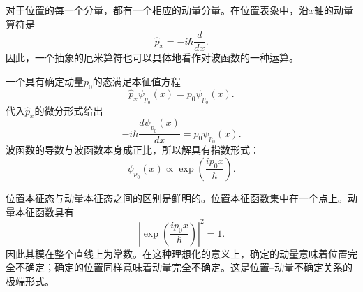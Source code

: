 对于位置的每一个分量，都有一个相应的动量分量。在位置表象中，沿\(x\)轴的动量算符是
\begin{equation}
\hat p_x=-i\hbar\frac{d}{dx}.
\end{equation}
因此，一个抽象的厄米算符也可以具体地看作对波函数的一种运算。

一个具有确定动量\(p_0\)的态满足本征值方程
\begin{equation}
\hat p_x\psi_{p_0}(x)=p_0\psi_{p_0}(x).
\end{equation}
代入\(\hat p_x\)的微分形式给出
\begin{equation}
-i\hbar\frac{d\psi_{p_0}(x)}{dx}
=p_0\psi_{p_0}(x).
\end{equation}
波函数的导数与波函数本身成正比，所以解具有指数形式：
\begin{equation}
\psi_{p_0}(x)\propto
\exp\left(\frac{ip_0x}{\hbar}\right).
\end{equation}

\begin{classroomqa}
\end{classroomqa}

位置本征态与动量本征态之间的区别是鲜明的。位置本征函数集中在一个点上。动量本征函数具有
\begin{equation}
\left|\exp\left(\frac{ip_0x}{\hbar}\right)\right|^2=1.
\end{equation}
因此其模在整个直线上为常数。在这种理想化的意义上，确定的动量意味着位置完全不确定；确定的位置同样意味着动量完全不确定。这是位置--动量不确定关系的极端形式。

\begin{classroomqa}
\end{classroomqa}

\begin{classroomqa}
\end{classroomqa}


